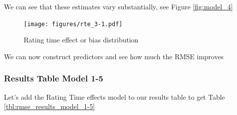 \documentclass[
]{article}
\newenvironment{Shaded}{}{}
\newcommand{\AttributeTok}[1]{\textcolor[rgb]{0.49,0.56,0.16}{#1}}
\newcommand{\DecValTok}[1]{\textcolor[rgb]{0.25,0.63,0.44}{#1}}
\newcommand{\FloatTok}[1]{\textcolor[rgb]{0.25,0.63,0.44}{#1}}
\newcommand{\FunctionTok}[1]{\textcolor[rgb]{0.02,0.16,0.49}{#1}}
\newcommand{\NormalTok}[1]{#1}
\newcommand{\OtherTok}[1]{\textcolor[rgb]{0.00,0.44,0.13}{#1}}
\newcommand{\SpecialCharTok}[1]{\textcolor[rgb]{0.25,0.44,0.63}{#1}}
\newcommand{\StringTok}[1]{\textcolor[rgb]{0.25,0.44,0.63}{#1}}
\begin{document}
\newpage

We can see that these estimates vary substantially, see Figure
\ref{fig:model_4}

\begin{figure}
\centering
\texttt{[image: figures/rte\_3-1.pdf]}
\caption{Rating time effect or bias distribution\label{fig:model_5}}
\end{figure}

We can now construct predictors and see how much the RMSE improves

\begin{Shaded}
\end{Shaded}

\newpage

\hypertarget{results-table-model-1-5}{%
\subsubsection{Results Table Model 1-5}\label{results-table-model-1-5}}

Let's add the Rating Time effects model to our results table to get
Table \ref{tbl:rmse_results_model_1-5}
\end{document}
